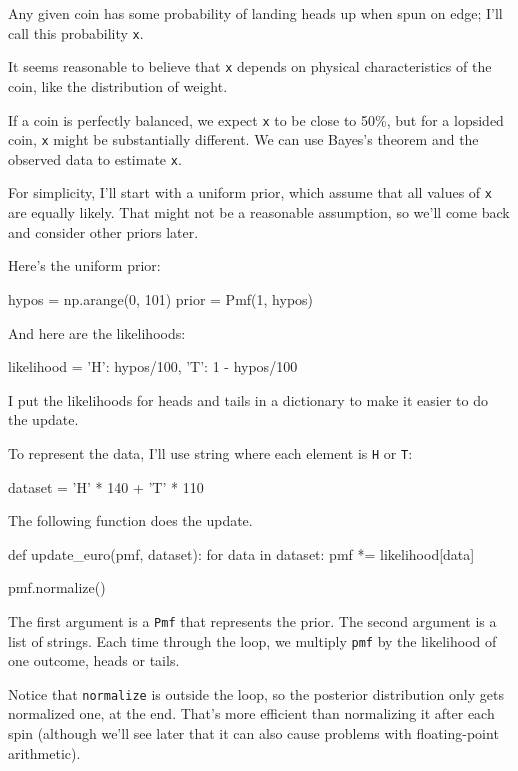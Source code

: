 \documentclass[12pt]{book}
\theoremstyle{exercise}
\newcommand{\py}[1]{{\tt #1}}%
\begin{document}
Any given coin has some probability of landing heads up when spun
on edge; I'll call this probability \py{x}.

It seems reasonable to believe that \py{x} depends
on physical characteristics of the coin, like the distribution
of weight.

If a coin is perfectly balanced, we expect \py{x} to be close to 50\%, but
for a lopsided coin, \py{x} might be substantially different.  We can use
Bayes's theorem and the observed data to estimate \py{x}.

For simplicity, I'll start with a uniform prior, which assume that all values of \py{x} are equally likely.
That might not be a reasonable assumption, so we'll come back and consider other priors later.

Here's the uniform prior:

\begin{code}
hypos = np.arange(0, 101)
prior = Pmf(1, hypos)
\end{code}

And here are the likelihoods:

\begin{code}
likelihood = {
    'H': hypos/100,
    'T': 1 - hypos/100
}
\end{code}

I put the likelihoods for heads and tails in a dictionary to make it easier to do the update.

To represent the data, I'll use string where each element is \py{H} or \py{T}:

\begin{code}
dataset = 'H' * 140 + 'T' * 110
\end{code}

The following function does the update.

\begin{code}
def update_euro(pmf, dataset):
    for data in dataset:
        pmf *= likelihood[data]

    pmf.normalize()
\end{code}

The first argument is a \py{Pmf} that represents the prior.
The second argument is a list of strings.
Each time through the loop, we multiply \py{pmf} by the likelihood of one outcome, heads or tails.

Notice that \py{normalize} is outside the loop, so the posterior distribution only gets normalized one, at the end.
That's more efficient than normalizing it after each spin (although we'll see later that it can also cause problems with floating-point arithmetic).
\end{document}
